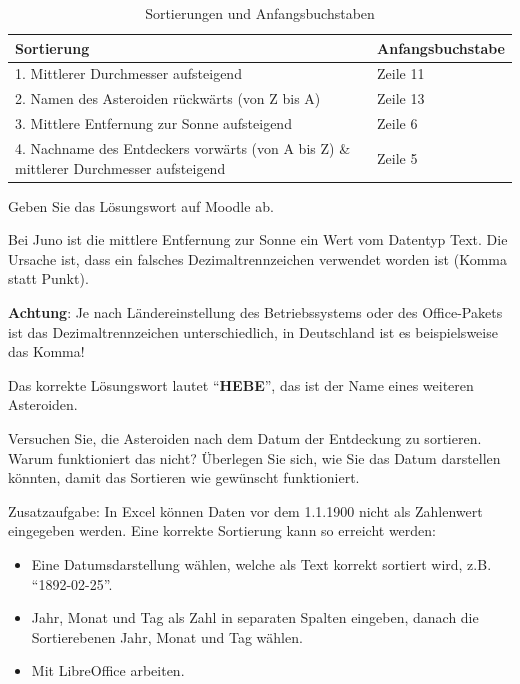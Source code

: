 \begin{mysubmission}
    \begin{table}[H]
        \centering
        \begin{tabular}{p{10cm}|l}
            \toprule
            Sortierung                                                                             & Anfangsbuchstabe \\
            \midrule\midrule
            1. Mittlerer Durchmesser aufsteigend                                                   & Zeile 11         \\
            2. Namen des Asteroiden rückwärts (von Z bis A)                                        & Zeile 13         \\
            3. Mittlere Entfernung zur Sonne aufsteigend                                           & Zeile 6          \\
            4. Nachname des Entdeckers vorwärts (von A bis Z) \& mittlerer Durchmesser aufsteigend & Zeile 5          \\
            \bottomrule
        \end{tabular}
        \caption{Sortierungen und Anfangsbuchstaben}
    \end{table}
    Geben Sie das Lösungswort auf Moodle ab.
    \begin{myanswer}
        Bei Juno ist die mittlere Entfernung zur Sonne ein Wert vom Datentyp Text. Die Ursache ist, dass ein falsches Dezimaltrennzeichen verwendet worden ist (Komma statt Punkt).

        \textbf{Achtung}: Je nach Ländereinstellung des Betriebssystems oder des Office-Pakets ist das Dezimaltrennzeichen unterschiedlich, in Deutschland ist es beispielsweise das Komma!

        Das korrekte Lösungswort lautet ``\textbf{HEBE}'', das ist der Name eines weiteren Asteroiden.
    \end{myanswer}
\end{mysubmission}


\begin{mychallenge}
    Versuchen Sie, die Asteroiden nach dem Datum der Entdeckung zu sortieren. Warum funktioniert das nicht? Überlegen Sie sich, wie Sie das Datum darstellen könnten, damit das Sortieren wie gewünscht funktioniert.
    \begin{myanswer}
        Zusatzaufgabe: In Excel können Daten vor dem 1.1.1900 nicht als Zahlenwert eingegeben werden. Eine korrekte Sortierung kann so erreicht werden:

        \begin{itemize}
            \item  Eine Datumsdarstellung wählen, welche als Text korrekt sortiert wird, z.B. ``1892-02-25''.
            \item Jahr, Monat und Tag als Zahl in separaten Spalten eingeben, danach die Sortierebenen Jahr, Monat und Tag wählen.
            \item Mit LibreOffice arbeiten.
        \end{itemize}
    \end{myanswer}
\end{mychallenge}
